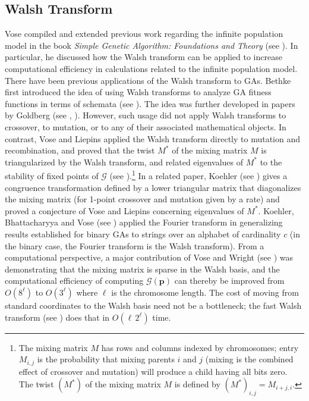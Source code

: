 \subsection{Walsh Transform}
Vose compiled and extended previous work regarding the infinite population model in the book 
\textit{Simple Genetic Algorithm: Foundations and Theory} (see \cite{Vose1999}). 
In particular, he discussed how the Walsh transform can be applied to increase 
computational efficiency in calculations related to the infinite population model. 
There have been previous applications of the Walsh transform to GAs. Bethke first introduced the 
idea of using Walsh transforms to analyze GA fitness functions in terms of schemata (see \cite{Bethke1981}). 
The idea was further developed in papers by Goldberg (see \cite{Goldberg1989a}, \cite{Goldberg1989b}). 
However, such usage did not apply Walsh transforms  to crossover, to mutation, or to any of their 
associated mathematical objects. In contrast, Vose and Liepins applied the Walsh transform directly to mutation and recombination, and proved that the 
twist $M^\ast$ of the mixing matrix $M$ is triangularized by the Walsh transform, and 
related eigenvalues of $M^\ast$ to the stability of fixed points of $\mathcal{G}$ (see \cite{VoseLiepins1991}).\footnote{The mixing 
matrix $M$ has rows and columns indexed by chromosomes; entry $M_{i,j}$ is the probability 
that mixing parents $i$ and $j$ (mixing is the combined effect of crossover and mutation) will produce a 
child having all bits zero. The twist $(M^\ast)$ of the mixing matrix $M$ is defined by $(M^\ast)_{i,j} = M_{i+j, i}$.} 
In a related paper, Koehler (see \cite{Koehler1994}) gives a congruence 
transformation defined by a lower triangular matrix that diagonalizes the mixing matrix (for 1-point crossover and mutation 
given by a rate) and proved a conjecture of Vose and Liepins concerning eigenvalues of $M^\ast$. Koehler, Bhattacharyya 
and Vose (see \cite{KoehlerBhatta1997}) applied the Fourier transform in generalizing results established 
for binary GAs to 
strings over an alphabet of cardinality $c$ (in the binary case, the Fourier transform is the Walsh transform). 
From a computational perspective, a major contribution of Vose and Wright (see \cite{VoseWright1998}) was demonstrating that 
the mixing matrix is sparse in the Walsh basis, and the computational efficiency of 
computing $\mathcal{G}(\bm{p})$ can thereby be improved from 
$O(8^\ell)$ to $O(3^\ell)$ where $\ell$ is the chromosome length. The cost of moving from standard coordinates to the Walsh basis need not be a bottleneck; 
the fast Walsh transform (see \cite{Shanks1969}) does that in $O(\ell \, 2^\ell)$ time.



